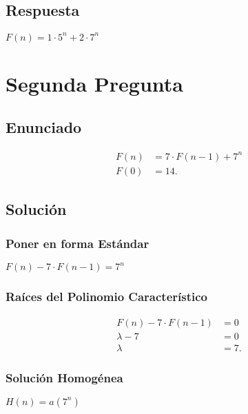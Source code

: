    \subsection{Respuesta}
    $F\left( n \right) = 1\cdot 5^{n} + 2 \cdot 7^{n} $

    \section*{Segunda Pregunta}
    \subsection*{Enunciado}
    \begin{align*}
      F\left( n \right) &= 7\cdot F\left( n -1 \right) + 7^n\\
      F\left( 0 \right) &= 14
    .\end{align*}
    \subsection*{Solución}
    \subsubsection*{Poner en forma Estándar}
    $F\left( n \right) - 7\cdot F\left( n - 1 \right) = 7^{n}$

    \subsubsection*{Raíces del Polinomio Característico}
    \begin{align*}
      F\left( n \right) - 7\cdot F\left( n - 1 \right) &= 0 \\
      \lambda - 7 &= 0 \\
      \lambda &= 7
    .\end{align*}
    \subsubsection*{Solución Homogénea}
    $H\left( n \right) = a\left( 7^{n} \right) $

